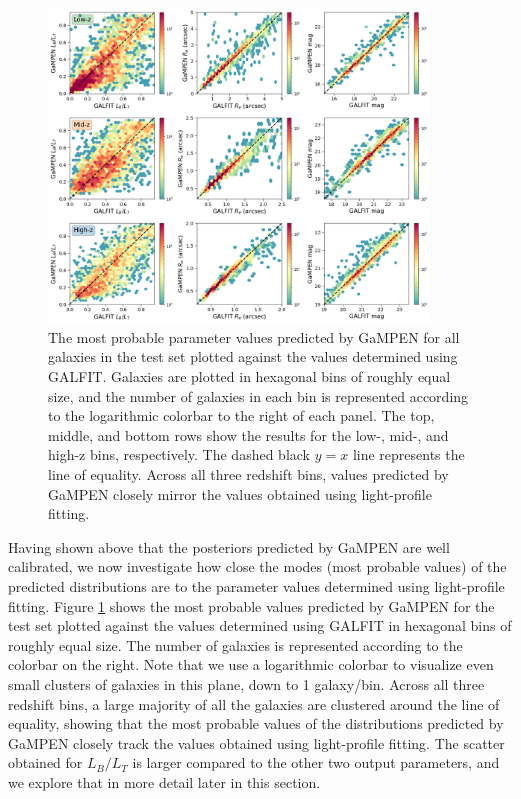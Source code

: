 \documentclass[linenumbers,twocolumn,twocolappendix]{aastex631}
\newcommand\gampen{GaMPEN}
\begin{document}
\begin{CJK*}{UTF8}{gbsn}
\begin{figure}[htb]
    \centering
    \includegraphics[width = 0.9\textwidth]{pred_true_all_z.png}
    \caption{The most probable parameter values predicted by \gampen{} for all galaxies in the test set plotted against the values determined using GALFIT. Galaxies are plotted in hexagonal bins of roughly equal size, and the number of galaxies in each bin is represented according to the logarithmic colorbar to the right of each panel. The top, middle, and bottom rows show the results for the low-, mid-, and high-z bins, respectively. The dashed black $y=x$ line represents the line of equality. Across all three redshift bins, values predicted by \gampen{} closely mirror the values obtained using light-profile fitting.}
    \label{fig:pred_true_all_z}
\end{figure}

Having shown above that the posteriors predicted by \gampen{} are well calibrated, we now investigate how close the modes (most probable values) of the predicted distributions are to the parameter values determined using light-profile fitting. Figure \ref{fig:pred_true_all_z} shows the most probable values predicted by \gampen{} for the test set plotted against the values determined using GALFIT in hexagonal bins of roughly equal size. The number of galaxies is represented according to the colorbar on the right. Note that we use a logarithmic colorbar to visualize even small clusters of galaxies in this plane, down to 1 galaxy/bin. Across all three redshift bins, a large majority of all the galaxies are clustered around the line of equality, showing that the most probable values of the distributions predicted by \gampen{} closely track the values obtained using light-profile fitting. The scatter obtained for $L_B/L_T$ is larger compared to the other two output parameters, and we explore that in more detail later in this section.


\end{CJK*}
\end{document}
